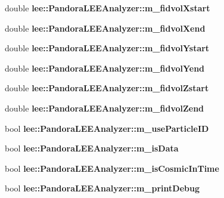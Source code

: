 \begin{DoxyCompactItemize}
\item 
\hypertarget{group__lee_ga56d3f395f76ae35174ea4714598debb2}{double {\bfseries lee\-::\-Pandora\-L\-E\-E\-Analyzer\-::m\-\_\-fidvol\-Xstart}}\label{group__lee_ga56d3f395f76ae35174ea4714598debb2}

\item 
\hypertarget{group__lee_gac263324598456c587395ce39f9a86b4a}{double {\bfseries lee\-::\-Pandora\-L\-E\-E\-Analyzer\-::m\-\_\-fidvol\-Xend}}\label{group__lee_gac263324598456c587395ce39f9a86b4a}

\item 
\hypertarget{group__lee_ga678aca01684db5a8a9abcb6903a7eee5}{double {\bfseries lee\-::\-Pandora\-L\-E\-E\-Analyzer\-::m\-\_\-fidvol\-Ystart}}\label{group__lee_ga678aca01684db5a8a9abcb6903a7eee5}

\item 
\hypertarget{group__lee_gad8b5a3fbf63831101e06bf3f7c831a03}{double {\bfseries lee\-::\-Pandora\-L\-E\-E\-Analyzer\-::m\-\_\-fidvol\-Yend}}\label{group__lee_gad8b5a3fbf63831101e06bf3f7c831a03}

\item 
\hypertarget{group__lee_ga2ecd11cab7811730100be8a133cb686f}{double {\bfseries lee\-::\-Pandora\-L\-E\-E\-Analyzer\-::m\-\_\-fidvol\-Zstart}}\label{group__lee_ga2ecd11cab7811730100be8a133cb686f}

\item 
\hypertarget{group__lee_gab2b230f2c1c2991564e8078fa7ce52e9}{double {\bfseries lee\-::\-Pandora\-L\-E\-E\-Analyzer\-::m\-\_\-fidvol\-Zend}}\label{group__lee_gab2b230f2c1c2991564e8078fa7ce52e9}

\item 
\hypertarget{group__lee_ga0418238c0019b7fe0bad6117348ff4f3}{bool {\bfseries lee\-::\-Pandora\-L\-E\-E\-Analyzer\-::m\-\_\-use\-Particle\-I\-D}}\label{group__lee_ga0418238c0019b7fe0bad6117348ff4f3}

\item 
\hypertarget{group__lee_ga6dde30dd232da74cc8e5735babb021c8}{bool {\bfseries lee\-::\-Pandora\-L\-E\-E\-Analyzer\-::m\-\_\-is\-Data}}\label{group__lee_ga6dde30dd232da74cc8e5735babb021c8}

\item 
\hypertarget{group__lee_ga10e86bba3e7853bdf00765cb996830fb}{bool {\bfseries lee\-::\-Pandora\-L\-E\-E\-Analyzer\-::m\-\_\-is\-Cosmic\-In\-Time}}\label{group__lee_ga10e86bba3e7853bdf00765cb996830fb}

\item 
\hypertarget{group__lee_ga355302cac15228cf63650efc20765ab8}{bool {\bfseries lee\-::\-Pandora\-L\-E\-E\-Analyzer\-::m\-\_\-print\-Debug}}\label{group__lee_ga355302cac15228cf63650efc20765ab8}


\end{DoxyCompactItemize}
